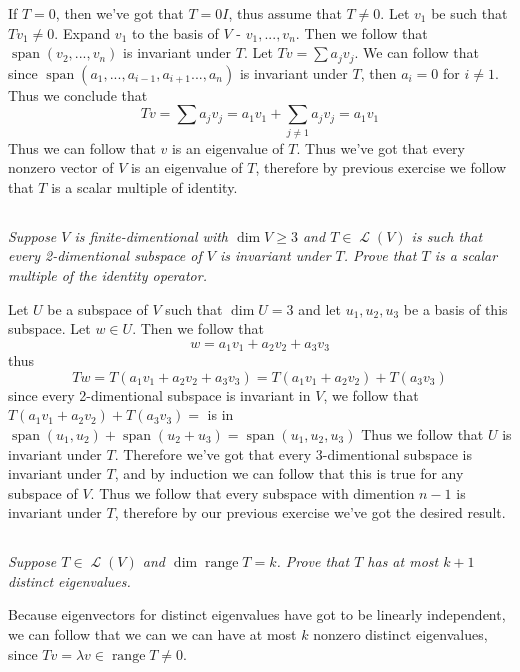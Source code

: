 \documentclass[11pt,oneside,titlepage]{book}
\DeclareMathOperator \map {\mathcal {L}}
\DeclareMathOperator \range {range}
\DeclareMathOperator \Span {span}
\begin{document}
If $T = 0$, then we've got that $T = 0I$, thus assume that $T \neq 0$.
Let $v_1$ be such that $Tv_1 \neq 0$. Expand $v_1$ to the basis of $V$ - $v_1, ..., v_n$.
Then we follow that $\Span(v_2, ..., v_n)$ is invariant under $T$.
Let $Tv = \sum{a_j v_j}$. We can follow that since 
$\Span(a_1, ..., a_{i - 1}, a_{i + 1} ..., a_n)$ is invariant under $T$, then $a_i = 0$
for $i \neq 1$. Thus we conclude that
$$Tv = \sum{a_j v_j} = a_1 v_1 + \sum_{j \neq 1}{a_j v_j} = a_1 v_1$$
Thus we can follow that $v$ is an eigenvalue of $T$. Thus we've got that every nonzero
vector of $V$ is an eigenvalue of $T$, therefore by previous exercise we follow that
$T$ is a scalar multiple of identity.

\subsection{}

\textit{Suppose $V$ is finite-dimentional with $\dim V \geq 3$ and $T \in \map(V)$ is such
  that every 2-dimentional subspace of $V$ is invariant under $T$. Prove that $T$ is a
  scalar multiple of the identity operator.}

Let $U$ be a subspace of $V$ such that $\dim U = 3$ and let $u_1, u_2, u_3$ be a basis of this
subspace. Let $w \in U$. Then we follow that 
$$w = a_1 v_1 + a_2 v_2 + a_3 v_3$$
thus
$$Tw = T(a_1 v_1 + a_2 v_2 + a_3 v_3) = T(a_1 v_1 + a_2 v_2) + T(a_3 v_3)$$
since every 2-dimentional subspace is invariant in $V$, we follow that
$T(a_1 v_1 + a_2 v_2) + T(a_3 v_3) = $ is in
$\Span(u_1, u_2) + \Span(u_2 + u_3) = \Span(u_1, u_2, u_3)$
Thus we follow that $U$ is invariant under $T$. Therefore we've got that every 3-dimentional
subspace is invariant under $T$, and by induction we can follow that this is true for
any subspace of $V$. Thus we follow that every subspace with dimention $n - 1$ is invariant
under $T$, therefore by our previous exercise we've got the desired result.

\subsection{}

\textit{Suppose $T \in \map(V)$ and $\dim \range T = k$. Prove that $T$ has at most $k + 1$
  distinct eigenvalues.}

Because eigenvectors for distinct eigenvalues have got to be linearly independent, we can follow
that we can we can have at most $k$ nonzero distinct eigenvalues, since
$Tv = \lambda v \in \range T \neq 0$.
\end{document}
